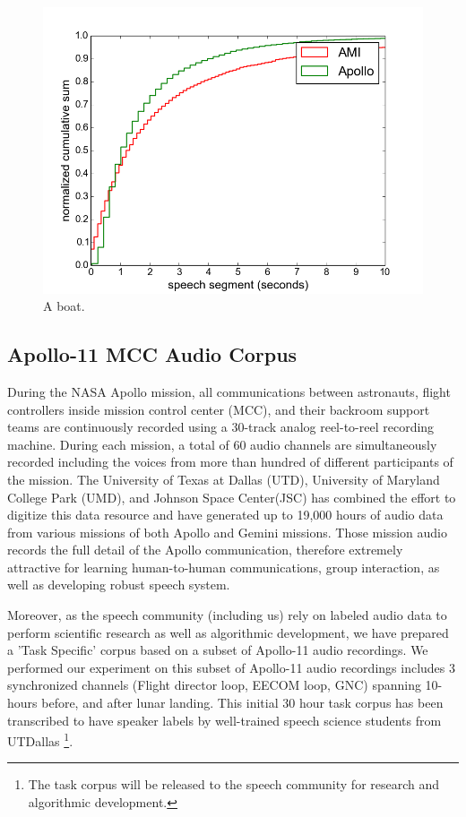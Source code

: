 \documentclass[journal]{IEEEtran}
\begin{document}
\begin{figure}[t]
	\includegraphics[width=\linewidth]{figs/lens}
	\caption{A boat.}
	\label{fig:boat1}
\end{figure}


\subsection{Apollo-11 MCC Audio Corpus}
During the NASA Apollo mission, all communications between astronauts, flight controllers inside mission control center (MCC), and their backroom support teams are continuously recorded using a 30-track analog reel-to-reel recording machine. During each mission, a total of 60 audio channels are simultaneously recorded including the voices from more than hundred of different participants of the mission. The University of Texas at Dallas (UTD), University of Maryland College Park (UMD), and Johnson Space Center(JSC) has combined the effort to digitize this data resource and have generated up to 19,000 hours of audio data from various missions of both Apollo and Gemini missions. Those mission audio records the full detail of the Apollo communication, therefore extremely attractive for learning human-to-human communications, group interaction, as well as developing robust speech system. 

Moreover, as the speech community (including us) rely on labeled audio data to perform scientific research as well as algorithmic development, we have prepared a 'Task Specific' corpus based on a subset of Apollo-11 audio recordings. We performed our experiment on this subset of Apollo-11 audio recordings includes 3 synchronized channels
(Flight director loop, EECOM loop, GNC) spanning 10-hours before, and after lunar landing. This initial 30 hour task corpus has been transcribed to have speaker labels by well-trained speech science students from UTDallas \footnote{The task corpus will be released to the speech community for research and algorithmic development.}.
\end{document}
